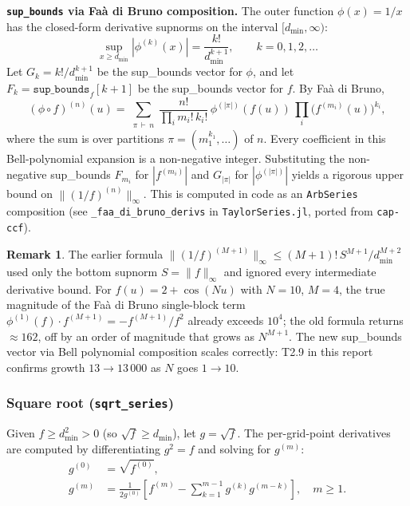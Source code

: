\documentclass[11pt]{article}
\theoremstyle{definition}
\newtheorem{remark}{Remark}
\begin{document}
\textbf{\texttt{sup\_bounds} via Fa\`a di Bruno composition.}
The outer function $\phi(x) = 1/x$ has the closed-form derivative supnorms
on the interval $[d_{\min}, \infty)$:
\[
  \sup_{x \ge d_{\min}} |\phi^{(k)}(x)|
    = \frac{k!}{d_{\min}^{k+1}},
  \qquad k = 0, 1, 2, \ldots
\]
Let $G_k = k!/d_{\min}^{k+1}$ be the sup\_bounds vector for $\phi$, and let
$F_k = \texttt{sup\_bounds}_f[k+1]$ be the sup\_bounds vector for $f$.
By Fa\`a di Bruno,
\[
  (\phi \circ f)^{(n)}(u)
    = \sum_{\substack{\pi \,\vdash\, n}}
      \frac{n!}{\prod_i m_i!\, k_i!}\,
      \phi^{(|\pi|)}(f(u))\, \prod_i \bigl(f^{(m_i)}(u)\bigr)^{k_i},
\]
where the sum is over partitions $\pi = (m_1^{k_1},\ldots)$ of $n$.
Every coefficient in this Bell-polynomial expansion is a non-negative integer.
Substituting the non-negative sup\_bounds $F_{m_i}$ for $|f^{(m_i)}|$ and
$G_{|\pi|}$ for $|\phi^{(|\pi|)}|$ yields a rigorous upper bound on
$\|(1/f)^{(n)}\|_\infty$. This is computed in code as an
\texttt{ArbSeries} composition (see \texttt{\_faa\_di\_bruno\_derivs} in
\texttt{TaylorSeries.jl}, ported from \texttt{cap-ccf}).

\begin{remark}
The earlier formula
$\|(1/f)^{(M+1)}\|_\infty \le (M+1)!\,S^{M+1}/d_{\min}^{M+2}$
used only the bottom supnorm $S = \|f\|_\infty$ and ignored every
intermediate derivative bound. For $f(u) = 2 + \cos(Nu)$ with $N = 10$,
$M = 4$, the true magnitude of the Fa\`a di Bruno single-block term
$\phi^{(1)}(f) \cdot f^{(M+1)} = -f^{(M+1)}/f^2$ already exceeds $10^{4}$;
the old formula returns $\approx 162$, off by an order of magnitude that
grows as $N^{M+1}$. The new sup\_bounds vector via Bell polynomial composition
scales correctly: T2.9 in this report confirms growth $13 \to 13\,000$
as $N$ goes $1 \to 10$.
\end{remark}

\subsubsection{Square root (\texttt{sqrt\_series})}

Given $f \ge d_{\min}^2 > 0$ (so $\sqrt{f} \ge d_{\min}$), let $g = \sqrt{f}$.
The per-grid-point derivatives are computed by differentiating $g^2 = f$ and
solving for $g^{(m)}$:
\begin{align}
  g^{(0)} &= \sqrt{f^{(0)}}, \label{eq:sqrt0}\\
  g^{(m)} &= \frac{1}{2g^{(0)}}
              \left[f^{(m)} - \sum_{k=1}^{m-1} g^{(k)} g^{(m-k)}\right],
             \quad m \ge 1. \label{eq:sqrtm}
\end{align}
\end{document}
